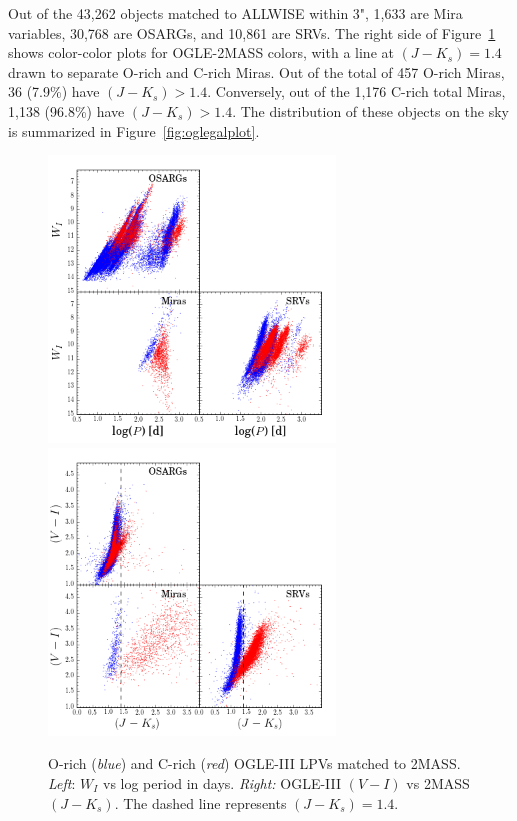 Out of the 43,262 objects matched to ALLWISE within 3", 1,633 are Mira variables, 30,768 are OSARGs, and 10,861 are SRVs. The right side of Figure~\ref{fig:oglepmag} shows color-color plots for OGLE-2MASS colors, with a line at $(J-K_s) = 1.4$ drawn to separate O-rich and C-rich Miras. Out of the total of 457 O-rich Miras, 36 (7.9\%) have $(J-K_s) > 1.4$. Conversely, out of the 1,176 C-rich total Miras, 1,138 (96.8\%) have $(J-K_s) > 1.4$. The distribution of these objects on the sky is summarized in Figure~\ref{fig:oglegalplot}.

\begin{figure}[h]
\includegraphics[width=3in]{figs/ogle_2mass_period_mag_threeplot.png}
\includegraphics[width=3in]{figs/ogle_2mass_color_color_threeplot.png}
\caption{O-rich (\emph{blue}) and C-rich (\emph{red}) OGLE-III LPVs matched to 2MASS. \emph{Left}: $W_I$ vs log period in days. \emph{Right:} OGLE-III $(V-I)$ vs 2MASS $(J-K_s)$. The dashed line represents $(J-K_s) = 1.4$. \label{fig:oglepmag}}
\end{figure}

